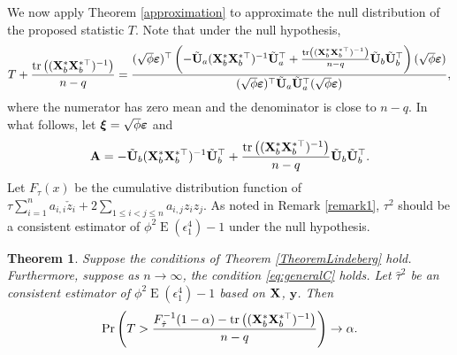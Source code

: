 \documentclass[11pt]{article}
\DeclareMathOperator{\mytr}{tr}
\DeclareMathOperator{\myE}{E}
\newcommand{\By}{\mathbf{y}}    \newcommand{\Bz}{\mathbf{z}}
\newcommand{\BA}{\mathbf{A}}    \newcommand{\BB}{\mathbf{B}}    \newcommand{\BC}{\mathbf{C}}    \newcommand{\BD}{\mathbf{D}}    \newcommand{\BE}{\mathbf{E}}    \newcommand{\BF}{\mathbf{F}}    \newcommand{\BG}{\mathbf{G}}    \newcommand{\BH}{\mathbf{H}}    \newcommand{\BI}{\mathbf{I}}    \newcommand{\BJ}{\mathbf{J}}    \newcommand{\BK}{\mathbf{K}}    \newcommand{\BL}{\mathbf{L}}
\newcommand{\bfsym}[1]{\ensuremath{\boldsymbol{#1}}}
\def\bxi{\bfsym {\xi}}
\theoremstyle{plain}
\newtheorem{theorem}{\quad\quad Theorem}
\theoremstyle{definition}
\theoremstyle{remark}
\begin{document}
We now apply Theorem \ref{approximation} to approximate the null distribution of the proposed statistic $T$.
Note that under the null hypothesis,
\begin{equation*}
    T+\frac{\mytr\left( (\BX_b^* \BX_{b}^{*\top})^{-1} \right)}{n-q} 
    =\frac{ (\sqrt \phi \bepsilon)^\top 
        \left( 
    -\tilde \BU_a (\BX_b^* \BX_b^{*\top})^{-1} \tilde \BU_a^\top
 + \frac{\mytr\left( (\BX_b^* \BX_b^{*\top})^{-1} \right)}{n-q}\tilde{\BU}_b \tilde{\BU}_b^\top
        \right)
    (\sqrt \phi \bepsilon)}{ (\sqrt \phi \bepsilon)^\top \tilde \BU_a  \tilde \BU_a^\top (\sqrt \phi \bepsilon)},
\end{equation*}
where the numerator has zero mean and the denominator is close to $n-q$.
In what follows, let $\bxi=\sqrt \phi \bepsilon$ and 
    \begin{equation*}
        \BA= -\tilde{\BU}_b (\BX_{b}^* \BX_b^{*\top})^{-1} \tilde{\BU}_b^\top 
        + \frac{\mytr\left( (\BX_b^* \BX_b^{*\top})^{-1} \right)}{n-q}\tilde{\BU}_b \tilde{\BU}_b^\top.
    \end{equation*}
    Let $F_{\tau} (x)$ be the cumulative distribution function of $
            \tau \sum_{i=1}^n  a_{i,i}\check z_i
        +2\sum_{1\leq i <j \leq n} a_{i,j} z_i z_j
        $.
        As noted in Remark \ref{remark1}, $\tau^2$ should be a consistent estimator of $\phi^2 \myE (\epsilon_1^4)-1$ under the null hypothesis.

\begin{theorem}
    Suppose the conditions of Theorem \ref{TheoremLindeberg} hold. Furthermore, suppose as $n\to \infty$, the condition \eqref{eq:generalC} holds.
        Let $\hat \tau^2$ be an consistent estimator of $\phi^2 \myE (\epsilon_1^4)-1$ based on $\mathbf{X}$, $\By$.
    Then
    \begin{equation*}
            \Pr\left( T > \frac{F^{-1}_{\hat \tau} (1-\alpha)-\mytr\left( (\BX_b^* \BX_b^{*\top})^{-1}  \right)}{n-q} \right)
            \to \alpha.
    \end{equation*}
    \label{thm:criticalValue}
\end{theorem}
\end{document}

